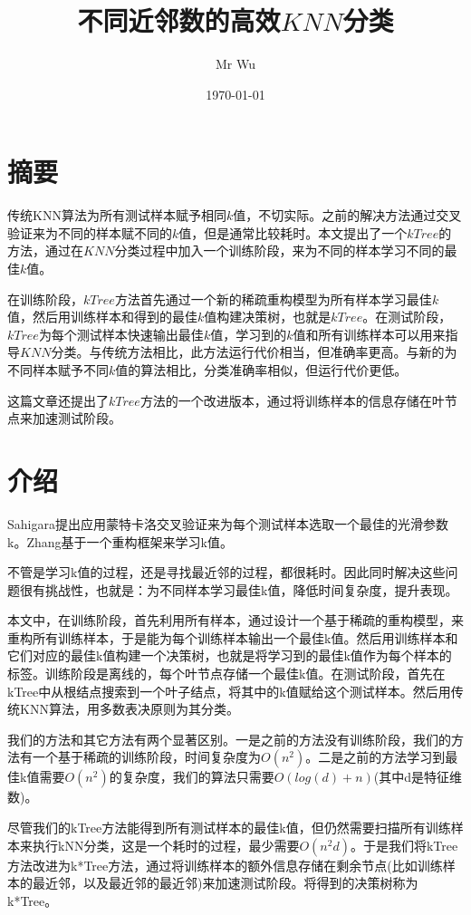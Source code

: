\documentclass{ctexart}
\title{不同近邻数的高效$ KNN $分类}
\author{Mr Wu}
\date{\today}
\begin{document}
	\maketitle
	\section{摘要}
	传统KNN算法为所有测试样本赋予相同$ k $值，不切实际。之前的解决方法通过交叉验证来为不同的样本赋不同的$ k $值，但是通常比较耗时。本文提出了一个$ kTree $的方法，通过在$ KNN $分类过程中加入一个训练阶段，来为不同的样本学习不同的最佳$ k $值。
	
	在训练阶段，$ kTree $方法首先通过一个新的稀疏重构模型为所有样本学习最佳$ k $值，然后用训练样本和得到的最佳$ k $值构建决策树，也就是$ kTree $。在测试阶段，$ kTree $为每个测试样本快速输出最佳$ k $值，学习到的$ k $值和所有训练样本可以用来指导$ KNN $分类。与传统方法相比，此方法运行代价相当，但准确率更高。与新的为不同样本赋予不同$ k $值的算法相比，分类准确率相似，但运行代价更低。
	
	这篇文章还提出了$ kTree $方法的一个改进版本，通过将训练样本的信息存储在叶节点来加速测试阶段。
	\section{介绍}
	Sahigara提出应用蒙特卡洛交叉验证来为每个测试样本选取一个最佳的光滑参数k。Zhang基于一个重构框架来学习k值。
	
	不管是学习k值的过程，还是寻找最近邻的过程，都很耗时。因此同时解决这些问题很有挑战性，也就是：为不同样本学习最佳k值，降低时间复杂度，提升表现。
	
	本文中，在训练阶段，首先利用所有样本，通过设计一个基于稀疏的重构模型，来重构所有训练样本，于是能为每个训练样本输出一个最佳k值。然后用训练样本和它们对应的最佳k值构建一个决策树，也就是将学习到的最佳k值作为每个样本的标签。训练阶段是离线的，每个叶节点存储一个最佳k值。在测试阶段，首先在kTree中从根结点搜索到一个叶子结点，将其中的k值赋给这个测试样本。然后用传统KNN算法，用多数表决原则为其分类。
	
	我们的方法和其它方法有两个显著区别。一是之前的方法没有训练阶段，我们的方法有一个基于稀疏的训练阶段，时间复杂度为$ O(n^2) $。二是之前的方法学习到最佳k值需要$ O(n^2) $的复杂度，我们的算法只需要$ O(log(d)+n) $(其中d是特征维数)。
	
	尽管我们的kTree方法能得到所有测试样本的最佳k值，但仍然需要扫描所有训练样本来执行kNN分类，这是一个耗时的过程，最少需要$ O(n^2d) $。于是我们将kTree方法改进为k*Tree方法，通过将训练样本的额外信息存储在剩余节点(比如训练样本的最近邻，以及最近邻的最近邻)来加速测试阶段。将得到的决策树称为k*Tree。
	
\end{document}

